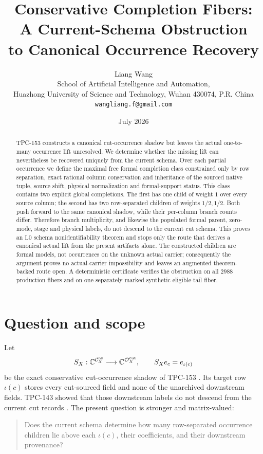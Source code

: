 \documentclass[11pt]{article}
\title{\textbf{Conservative Completion Fibers:}\\
\textbf{A Current-Schema Obstruction}\\
\textbf{to Canonical Occurrence Recovery}}
\author{Liang Wang\\
School of Artificial Intelligence and Automation,\\
Huazhong University of Science and Technology, Wuhan 430074, P.R. China\\
\texttt{wangliang.f@gmail.com}}
\date{July 2026}
\theoremstyle{definition}
\theoremstyle{remark}
\newcommand{\Cns}{\mathcal C_X^{\rm ns}}
\newcommand{\Ocut}{\mathcal O_X^{\rm cut}}
\begin{document}
\maketitle

\begin{abstract}
TPC-153 constructs a canonical cut-occurrence shadow but leaves the
actual one-to-many occurrence lift unresolved.  We determine whether
the missing lift can nevertheless be recovered uniquely from the
current schema.  Over each partial occurrence we define the maximal
free formal completion class constrained only by row separation,
exact rational column conservation and inheritance of the sourced
native tuple, source shift, physical normalization and formal-support
status.  This class contains two explicit global completions.  The
first has one child of weight \(1\) over every source column; the
second has two row-separated children of weights \(1/2,1/2\).  Both
push forward to the same canonical shadow, while their per-column
branch counts differ.  Therefore branch multiplicity, and likewise
the populated formal parent, zero-mode, stage and physical labels,
do not descend to the current cut schema.  This proves an
\(\mathrm{L0}\) schema nonidentifiability theorem and stops only the
route that derives a canonical actual lift from the present artifacts
alone.  The constructed children are formal models, not occurrences
on the unknown actual carrier; consequently the argument proves no
actual-carrier impossibility and leaves an augmented theorem-backed
route open.  A deterministic certificate verifies the obstruction on
all \(2988\) production fibers and on one separately marked synthetic
eligible-tail fiber.
\end{abstract}

\section{Question and scope}

Let
\[
 S_X:\mathbb C^{\Cns}\longrightarrow\mathbb C^{\Ocut},
 \qquad S_Xe_c=e_{\iota(c)}
\]
be the exact conservative cut-occurrence shadow of TPC-153
\citep{WangTPC153}.  Its target row \(\iota(c)\) stores every
cut-sourced field and none of the unarchived downstream fields.
TPC-143 showed that those downstream labels do not descend from the
current cut records \citep{WangTPC143}.  The present question is
stronger and matrix-valued:

\begin{quote}
Does the current schema determine how many row-separated occurrence
children lie above each \(\iota(c)\), their coefficients, and their
downstream provenance?
\end{quote}
\end{document}
